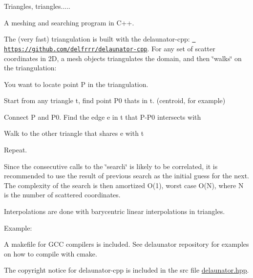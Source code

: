 \label{index_md_README}%
%
Triangles, triangles.....

A meshing and searching program in C++.

The (very fast) triangulation is built with the delaunator-\/cpp\+: \href{https://github.com/delfrrr/delaunator-cpp}{\texttt{ https\+://github.\+com/delfrrr/delaunator-\/cpp}}. For any set of scatter coordinates in 2D, a mesh objects triangulates the domain, and then \char`\"{}walks\char`\"{} on the triangulation\+:


\begin{DoxyItemize}
\item You want to locate point P in the triangulation.
\item Start from any triangle t, find point P0 that\textquotesingle{}s in t. (centroid, for example)
\item Connect P and P0. Find the edge e in t that P-\/\+P0 intersects with
\item Walk to the other triangle that shares e with t
\item Repeat.
\end{DoxyItemize}

Since the consecutive calls to the \char`\"{}search\char`\"{} is likely to be correlated, it is recommended to use the result of previous search as the initial guess for the next. The complexity of the search is then amortized O(1), worst case O(\+N), where N is the number of scattered coordinates.

Interpolations are done with barycentric linear interpolations in triangles.

Example\+: 
\begin{DoxyCode}{0}
\DoxyCodeLine{}
\DoxyCodeLine{}
\DoxyCodeLine{\}}
\end{DoxyCode}


A makefile for G\+CC compilers is included. See delaunator repository for examples on how to compile with cmake.

The copyright notice for delaunator-\/cpp is included in the src file \mbox{\hyperlink{delaunator_8hpp_source}{delaunator.\+hpp}}. 